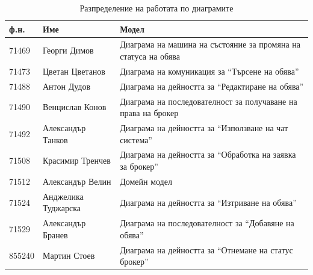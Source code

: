 \documentclass[a4paper]{article}
\begin{document}
\begin{table}[h]
\centering
\begin{tabular}{|l|l|l|}
\hline
\textbf{ф.н.} & \textbf{Име}        & \textbf{Модел}                                               		\\ \hline
71469         & Георги Димов        & Диаграма на машина на състояние за промяна на статуса на обява	\\ \hline
71473         & Цветан Цветанов     & Диаграма на комуникация за ``Търсене на обява''					\\ \hline
71488         & Антон Дудов         & Диаграма на дейността за ``Редактиране на обява''					\\ \hline
71490         & Венцислав Конов     & Диаграма на последователност за получаване на права на брокер		\\ \hline
71492         & Александър Танков   & Диаграма на дейността за ``Използване на чат система''			\\ \hline
71508         & Красимир Тренчев    & Диаграма на дейността за ``Обработка на заявка за брокер''		\\ \hline
71512         & Александър Велин    & Домейн модел						                                \\ \hline
71524         & Анджелика Туджарска & Диаграма на дейността за ``Изтриване на обява''					\\ \hline
71529         & Александър Бранев   & Диаграма на последователност за ``Добавяне на обява''				\\ \hline
855240        & Мартин Стоев        & Диаграма на дейността за ``Отнемане на статус брокер''			\\ \hline
\end{tabular}
\caption{Разпределение на работата по диаграмите}
\end{table}
\end{document}
